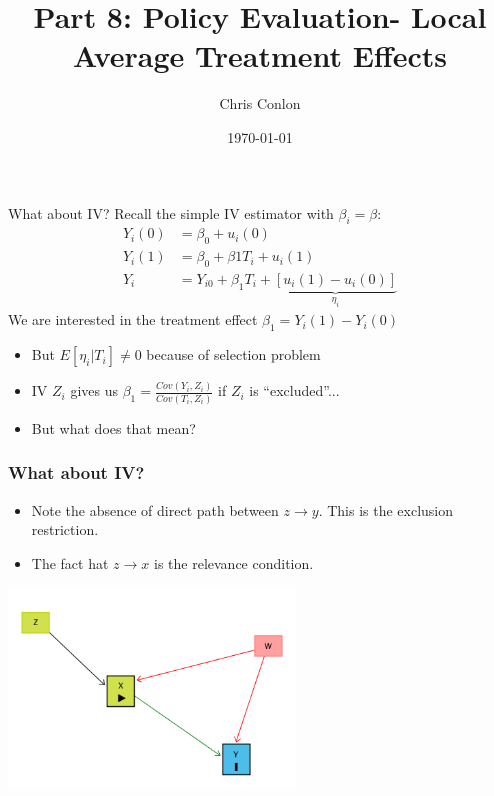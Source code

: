 \documentclass[xcolor=pdftex,dvipsnames,table,mathserif,aspectratio=169]{beamer}
\begin{document}
\title{Part 8: Policy Evaluation- Local Average Treatment Effects}
\author{Chris Conlon}
\date{\today}

\frame{\titlepage}



\begin{frame}{What about IV?}
Recall the simple IV estimator with $\beta_i = \beta$:
\begin{align*}
Y_i(0) &= \beta_0 + u_i(0)\\
Y_i(1) &= \beta_0 + \beta1 T_i +  u_i(1)\\
Y_i &= Y_{i0} + \beta_1 T_i  + \underbrace{[u_i(1) - u_i(0)]}_{\eta_i}
\end{align*}
We are interested in the \alert{treatment effect} $\beta_1 = Y_i(1) - Y_i(0)$
\begin{itemize}
\item But $E[\eta_i |  T_i] \neq 0$ because of \alert{selection problem}
\item IV $Z_i$ gives us $\beta_1 = \frac{Cov(Y_i,Z_i)}{Cov(T_i,Z_i)}$ if $Z_i$ is ``excluded''...
\item But what does that mean?
\end{itemize}
\end{frame}

\begin{frame}
\frametitle{What about IV?}
\begin{itemize}
\item Note the absence of direct path between $z \rightarrow y$. This is the \alert{exclusion restriction}.
\item The fact hat $z \rightarrow x$ is the \alert{relevance} condition.
\end{itemize}
\begin{center}
\includegraphics[width=3in]{./resources/dag-iv.png}
\end{center}

\end{frame}
\end{document}
